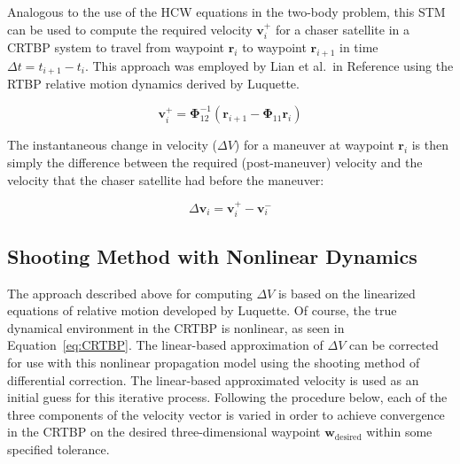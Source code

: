 \documentclass[letterpaper, preprint, paper,11pt]{AAS}	%
\begin{document}
Analogous to the use of the HCW equations in the two-body problem, this STM can be used to compute the required velocity \(\mathbf{v}_i^+\) for a chaser satellite in a CRTBP system to travel from waypoint \(\mathbf{r}_i\) to waypoint \(\mathbf{r}_{i+1}\) in time \( \Delta t = t_{i+1} - t_i\).  This approach was employed by Lian et al.~in Reference \cite{lian2011} using the RTBP relative motion dynamics derived by Luquette. 



\begin{equation} \label{eq:RequiredVelocity}
	\mathbf{v}_i^+ = \boldsymbol{\Phi}_{12}^{-1}(\mathbf{r}_{i+1} - \boldsymbol{\Phi}_{11}\mathbf{r}_i)
\end{equation}

The instantaneous change in velocity (\(\Delta V\)) for a maneuver at waypoint \(\mathbf{r}_i\) is then simply the difference between the required (post-maneuver) velocity and the velocity that the chaser satellite had before the maneuver:

\begin{equation} \label{eq:DeltaV}
	\Delta \mathbf{v}_i = \mathbf{v}_i^+ - \mathbf{v}_i^-
\end{equation}

\subsection{Shooting Method with Nonlinear Dynamics} \label{sec:shooting}
The approach described above for computing \(\Delta V\) is based on the linearized equations of relative motion developed by Luquette.  Of course, the true dynamical environment in the CRTBP is nonlinear, as seen in Equation~\eqref{eq:CRTBP}. The linear-based approximation of \(\Delta V\) can be corrected for use with this nonlinear propagation model using the shooting method of differential correction.  The linear-based approximated velocity is used as an initial guess for this iterative process.  Following the procedure below, each of the three components of the velocity vector is varied in order to achieve convergence in the CRTBP on the desired three-dimensional waypoint \(\mathbf{w}_{\mathrm{desired}}\) within some specified tolerance.
\end{document}
